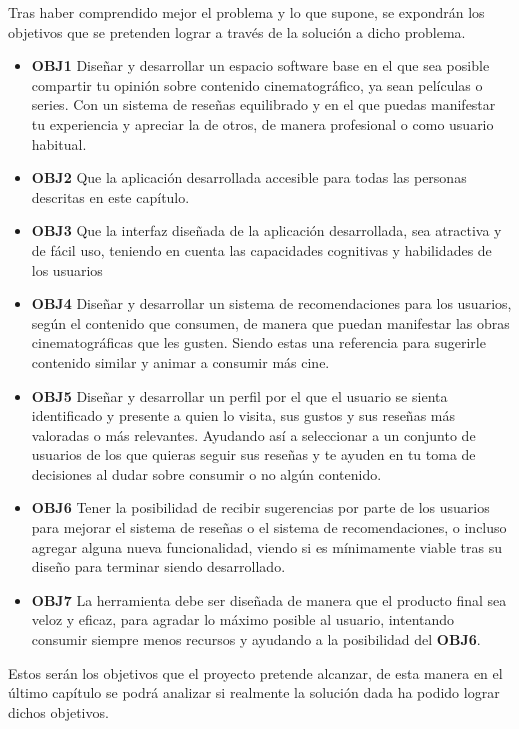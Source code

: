 Tras haber comprendido mejor el problema y lo que supone, se expondrán los objetivos que se pretenden 
lograr a través de la solución a dicho problema.
\begin{itemize}
    \item \textbf{OBJ1} Diseñar y desarrollar un espacio software base en el que sea posible 
    compartir tu opinión sobre contenido cinematográfico, ya sean películas o series. Con un 
    sistema de reseñas equilibrado y en el que puedas manifestar tu experiencia y apreciar la de otros, 
    de manera profesional o como usuario habitual.
    \item \textbf{OBJ2} Que la aplicación desarrollada accesible para todas las personas descritas en 
    este capítulo.
    \item \textbf{OBJ3} Que la interfaz diseñada de la aplicación desarrollada, sea atractiva y de 
    fácil uso, teniendo en cuenta las capacidades cognitivas y habilidades de los usuarios
    \item \textbf{OBJ4} Diseñar y desarrollar un sistema de recomendaciones para los usuarios, según el 
    contenido que consumen, de manera que puedan manifestar las obras cinematográficas que les gusten. 
    Siendo estas una referencia para sugerirle contenido similar y animar a consumir más cine.
    \item \textbf{OBJ5} Diseñar y desarrollar un perfil por el que el usuario se sienta identificado y 
    presente a quien lo visita, sus gustos y sus reseñas más valoradas o más relevantes. Ayudando así a
    seleccionar a un conjunto de usuarios de los que quieras seguir sus reseñas y te ayuden en tu toma 
    de decisiones al dudar sobre consumir o no algún contenido.
    \item \textbf{OBJ6} Tener la posibilidad de recibir sugerencias por parte de los usuarios para 
    mejorar el sistema de reseñas o el sistema de recomendaciones, o incluso agregar alguna nueva 
    funcionalidad, viendo si es mínimamente viable tras su diseño para terminar siendo desarrollado.
    \item \textbf{OBJ7} La herramienta debe ser diseñada de manera que el producto final sea veloz y 
    eficaz, para agradar lo máximo posible al usuario, intentando consumir siempre menos recursos y 
    ayudando a la posibilidad del \textbf{OBJ6}.
\end{itemize}
Estos serán los objetivos que el proyecto pretende alcanzar, de esta manera en el último capítulo se 
podrá analizar si realmente la solución dada ha podido lograr dichos objetivos.